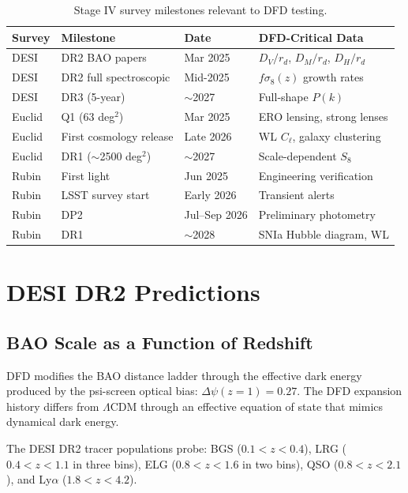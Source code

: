 \documentclass[12pt]{article}
\newcommand{\LCDM}{$\Lambda$CDM}
\begin{document}
\begin{table}[H]
\centering
\caption{Stage IV survey milestones relevant to DFD testing.}
\begin{tabular}{llll}
\toprule
\textbf{Survey} & \textbf{Milestone} & \textbf{Date} & \textbf{DFD-Critical Data} \\
\midrule
DESI & DR2 BAO papers & Mar 2025 & $D_V/r_d$, $D_M/r_d$, $D_H/r_d$ \\
DESI & DR2 full spectroscopic & Mid-2025 & $f\sigma_8(z)$ growth rates \\
DESI & DR3 (5-year) & $\sim$2027 & Full-shape $P(k)$ \\
Euclid & Q1 (63 deg$^2$) & Mar 2025 & ERO lensing, strong lenses \\
Euclid & First cosmology release & Late 2026 & WL $C_\ell$, galaxy clustering \\
Euclid & DR1 ($\sim$2500 deg$^2$) & $\sim$2027 & Scale-dependent $S_8$ \\
Rubin & First light & Jun 2025 & Engineering verification \\
Rubin & LSST survey start & Early 2026 & Transient alerts \\
Rubin & DP2 & Jul--Sep 2026 & Preliminary photometry \\
Rubin & DR1 & $\sim$2028 & SNIa Hubble diagram, WL \\
\bottomrule
\end{tabular}
\end{table}

\section{DESI DR2 Predictions}
\label{sec:desi}

\subsection{BAO Scale as a Function of Redshift}

DFD modifies the BAO distance ladder through the effective dark energy produced by the psi-screen optical bias: $\Delta\psi(z=1) = 0.27$. The DFD expansion history differs from \LCDM{} through an effective equation of state that mimics dynamical dark energy.

The DESI DR2 tracer populations probe: BGS ($0.1 < z < 0.4$), LRG ($0.4 < z < 1.1$ in three bins), ELG ($0.8 < z < 1.6$ in two bins), QSO ($0.8 < z < 2.1$), and Ly$\alpha$ ($1.8 < z < 4.2$).
\end{document}
